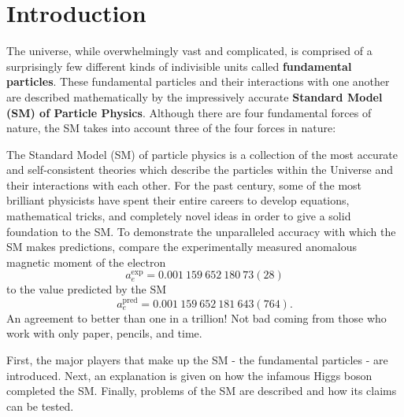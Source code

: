 \chapter{Introduction}


The universe, while overwhelmingly vast and complicated, is comprised of a surprisingly few different kinds of indivisible units called \textbf{fundamental particles}.
These fundamental particles and their interactions with one another are described mathematically by the impressively accurate \textbf{Standard Model (SM) of Particle Physics}.
Although there are four fundamental forces of nature, the SM takes into account three of the four forces in nature:

The Standard Model (SM) of particle physics is a collection of the most accurate and self-consistent theories which describe the particles within the Universe and their interactions with each other.
For the past century, some of the most brilliant physicists have spent their entire careers to develop equations, mathematical tricks, and completely novel ideas in order to give a solid foundation to the SM.
To demonstrate the unparalleled accuracy with which the SM makes predictions, compare the experimentally measured anomalous magnetic moment of the electron
\begin{equation*}
    a_e^{\mathrm{exp}} = 0.001\ 159\ 652\ 180\ 73(28)
\end{equation*}
to the value predicted by the SM
\begin{equation*}
    a_e^{\mathrm{pred}} = 0.001\ 159\ 652\ 181\ 643(764).
\end{equation*}
An agreement to better than one in a trillion! 
Not bad coming from those who work with only paper, pencils, and time.

First, the major players that make up the SM - the fundamental particles - are introduced.
Next, an explanation is given on how the infamous Higgs boson completed the SM.
Finally, problems of the SM are described and how its claims can be tested.

